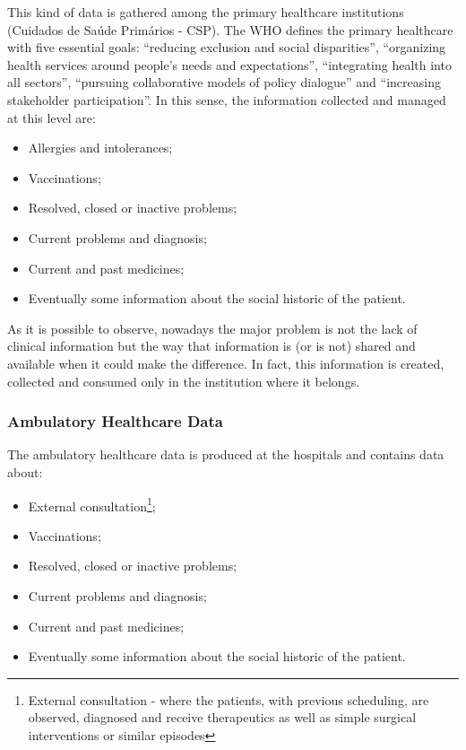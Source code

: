 This kind of data is gathered among the primary healthcare institutions (Cuidados de Saúde Primários - CSP). The WHO defines the primary healthcare with five essential goals: ``reducing exclusion and social disparities'', ``organizing health services around people's needs and expectations'', ``integrating health into all sectors'', ``pursuing collaborative models of policy dialogue'' and ``increasing stakeholder participation''. In this sense, the information collected and managed at this level are:
\begin{itemize}
\item Allergies and intolerances;
\item Vaccinations;
\item Resolved, closed or inactive problems;
\item Current problems and diagnosis;
\item Current and past medicines;
\item Eventually some information about the social historic of the patient.
\end{itemize}

As it is possible to observe, nowadays the major problem is not the lack of clinical information but the way that information is (or is not) shared and available when it could make the difference. In fact, this information is created, collected and consumed only in the institution where it belongs.


\subsubsection{Ambulatory Healthcare Data}

The ambulatory healthcare data is produced at the hospitals and contains data about:
\begin{itemize}
\item External consultation\footnote{External consultation - where the patients, with previous scheduling, are observed, diagnosed and receive therapeutics as well as simple surgical interventions or similar episodes};
\item Vaccinations;
\item Resolved, closed or inactive problems;
\item Current problems and diagnosis;
\item Current and past medicines;
\item Eventually some information about the social historic of the patient.
\end{itemize}

